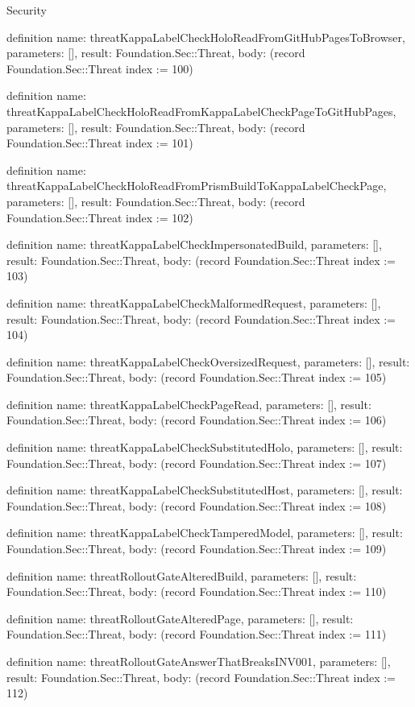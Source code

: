 \begin{lexlean}{Security}
\begin{semanticmodule}
definition{
  name: threatKappaLabelCheckHoloReadFromGitHubPagesToBrowser,
  parameters: [],
  result: Foundation.Sec::Threat,
  body: (record Foundation.Sec::Threat {index := 100})
}

definition{
  name: threatKappaLabelCheckHoloReadFromKappaLabelCheckPageToGitHubPages,
  parameters: [],
  result: Foundation.Sec::Threat,
  body: (record Foundation.Sec::Threat {index := 101})
}

definition{
  name: threatKappaLabelCheckHoloReadFromPrismBuildToKappaLabelCheckPage,
  parameters: [],
  result: Foundation.Sec::Threat,
  body: (record Foundation.Sec::Threat {index := 102})
}

definition{
  name: threatKappaLabelCheckImpersonatedBuild,
  parameters: [],
  result: Foundation.Sec::Threat,
  body: (record Foundation.Sec::Threat {index := 103})
}

definition{
  name: threatKappaLabelCheckMalformedRequest,
  parameters: [],
  result: Foundation.Sec::Threat,
  body: (record Foundation.Sec::Threat {index := 104})
}

definition{
  name: threatKappaLabelCheckOversizedRequest,
  parameters: [],
  result: Foundation.Sec::Threat,
  body: (record Foundation.Sec::Threat {index := 105})
}

definition{
  name: threatKappaLabelCheckPageRead,
  parameters: [],
  result: Foundation.Sec::Threat,
  body: (record Foundation.Sec::Threat {index := 106})
}

definition{
  name: threatKappaLabelCheckSubstitutedHolo,
  parameters: [],
  result: Foundation.Sec::Threat,
  body: (record Foundation.Sec::Threat {index := 107})
}

definition{
  name: threatKappaLabelCheckSubstitutedHost,
  parameters: [],
  result: Foundation.Sec::Threat,
  body: (record Foundation.Sec::Threat {index := 108})
}

definition{
  name: threatKappaLabelCheckTamperedModel,
  parameters: [],
  result: Foundation.Sec::Threat,
  body: (record Foundation.Sec::Threat {index := 109})
}

definition{
  name: threatRolloutGateAlteredBuild,
  parameters: [],
  result: Foundation.Sec::Threat,
  body: (record Foundation.Sec::Threat {index := 110})
}

definition{
  name: threatRolloutGateAlteredPage,
  parameters: [],
  result: Foundation.Sec::Threat,
  body: (record Foundation.Sec::Threat {index := 111})
}

definition{
  name: threatRolloutGateAnswerThatBreaksINV001,
  parameters: [],
  result: Foundation.Sec::Threat,
  body: (record Foundation.Sec::Threat {index := 112})
}


\end{semanticmodule}
\end{lexlean}
